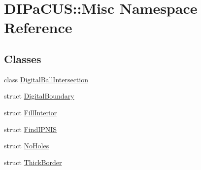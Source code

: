 \hypertarget{namespaceDIPaCUS_1_1Misc}{}\section{D\+I\+Pa\+C\+US\+:\+:Misc Namespace Reference}
\label{namespaceDIPaCUS_1_1Misc}
\subsection*{Classes}
\begin{DoxyCompactItemize}
\item 
class \mbox{\hyperlink{classDIPaCUS_1_1Misc_1_1DigitalBallIntersection}{Digital\+Ball\+Intersection}}
\item 
struct \mbox{\hyperlink{structDIPaCUS_1_1Misc_1_1DigitalBoundary}{Digital\+Boundary}}
\item 
struct \mbox{\hyperlink{structDIPaCUS_1_1Misc_1_1FillInterior}{Fill\+Interior}}
\item 
struct \mbox{\hyperlink{structDIPaCUS_1_1Misc_1_1FindIPNIS}{Find\+I\+P\+N\+IS}}
\item 
struct \mbox{\hyperlink{structDIPaCUS_1_1Misc_1_1NoHoles}{No\+Holes}}
\item 
struct \mbox{\hyperlink{structDIPaCUS_1_1Misc_1_1ThickBorder}{Thick\+Border}}
\end{DoxyCompactItemize}
